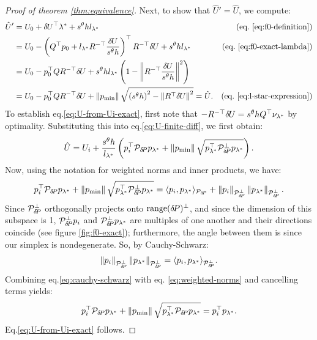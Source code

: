 \documentclass[smallcondensed]{svjour3}
\begin{document}
\begin{proof}[Proof of theorem \ref{thm:equivalence}]
  Next, to show that $\hat{U}' = \hat{U}$, we compute:
  \begin{align*}
    \hat{U}'
    &= U_0 + \delU^\top \lambda^* + s^\theta h l_{\lambda^*} & \mbox{(eq.\@ \ref{eq:f0-definition})} \\
    &= U_0 - \parens{Q^\top p_0 + l_{\lambda^*} R^{-\top} \frac{\delU}{s^\theta h}}^\top R^{-\top} \delU + s^\theta h l_{\lambda^*} & \mbox{(eq.\@ \ref{eq:f0-exact-lambda})} \\
    &= U_0 - p_0^\top Q R^{-\top} \delU + s^\theta h l_{\lambda^*} \parens{1 - \norm{R^{-\top} \frac{\delU}{s^\theta h}}^2} \\
    &= U_0 - p_0^\top Q R^{-\top} \delU + \norm{\pmin} \sqrt{\parens{s^\theta h}^2 - \norm{R^\top \delU}^2} = \hat{U}. & \mbox{(eq.\@ \ref{eq:l-star-expression})}
  \end{align*}
  To establish eq.\@ \ref{eq:U-from-Ui-exact}, first note that
  $-R^{-\top} {\delta \hspace{-0.09em} U} = s^\theta h Q^\top \nu_{\lambda^*}$ by
  optimality. Substituting this into eq.\@ \ref{eq:U-finite-diff},
  we first obtain:
  \begin{equation}
    \hat{U} = U_i + \frac{s^\theta h}{l_{\lambda^*}} \left(p_i^\top \mathcal{P}_{{\delta \hspace{-0.14em} P}} p_{\lambda^*} + \left\|p_{\operatorname{min}}\right\| \sqrt{p_{\lambda^*}^\top \mathcal{P}^\perp_{{\delta \hspace{-0.14em} P}} p_{\lambda^*}}\right).
  \end{equation}
  Now, using the notation for weighted norms and inner products, we have:
  \begin{equation}\label{eq:weighted-norms}
    p_i^\top \mathcal{P}_{{\delta \hspace{-0.14em} P}} p_{\lambda^*} + \left\|p_{\operatorname{min}}\right\| \sqrt{p_{\lambda^*}^\top \mathcal{P}^\perp_{{\delta \hspace{-0.14em} P}} p_{\lambda^*}} = \langle p_i, p_{\lambda^*} \rangle_{\mathcal{P}_{{\delta \hspace{-0.14em} P}}} + \left\|p_i\right\|_{\mathcal{P}^\perp_{{\delta \hspace{-0.14em} P}}} \left\|p_{\lambda^*}\right\|_{\mathcal{P}^\perp_{{\delta \hspace{-0.14em} P}}}.
  \end{equation}
  Since $\mathcal{P}^\perp_{{\delta \hspace{-0.14em} P}}$ orthogonally projects onto
  $\operatorname{range}({\delta \hspace{-0.14em} P})^\perp$, and since the dimension of this subspace is
  1, $\mathcal{P}^\perp_{{\delta \hspace{-0.14em} P}} p_i$ and
  $\mathcal{P}^\perp_{{\delta \hspace{-0.14em} P}} p_{\lambda^*}$ are multiples of one
  another and their directions coincide (see figure
  \ref{fig:f0-exact}); furthermore, the angle between them is since
  our simplex is nondegenerate. So, by Cauchy-Schwarz:
  \begin{equation}\label{eq:cauchy-schwarz}
    \left\|p_i\right\|_{\mathcal{P}^\perp_{{\delta \hspace{-0.14em} P}}} \left\|p_{\lambda^*}\right\|_{\mathcal{P}^\perp_{{\delta \hspace{-0.14em} P}}} = \langle p_i, p_{\lambda^*} \rangle_{\mathcal{P}^\perp_{{\delta \hspace{-0.14em} P}}}.
  \end{equation}
  Combining eq.\@ \ref{eq:cauchy-schwarz} with eq.\@
  \ref{eq:weighted-norms} and cancelling terms yields:
  \begin{equation}
    p_i^\top \mathcal{P}_{{\delta \hspace{-0.14em} P}} p_{\lambda^*} + \left\|p_{\operatorname{min}}\right\| \sqrt{p_{\lambda^*}^\top \mathcal{P}_{{\delta \hspace{-0.14em} P}} p_{\lambda^*}} = p_i^\top p_{\lambda^*}.
  \end{equation}
  Eq.\@ \ref{eq:U-from-Ui-exact} follows.


\end{proof}
\end{document}
